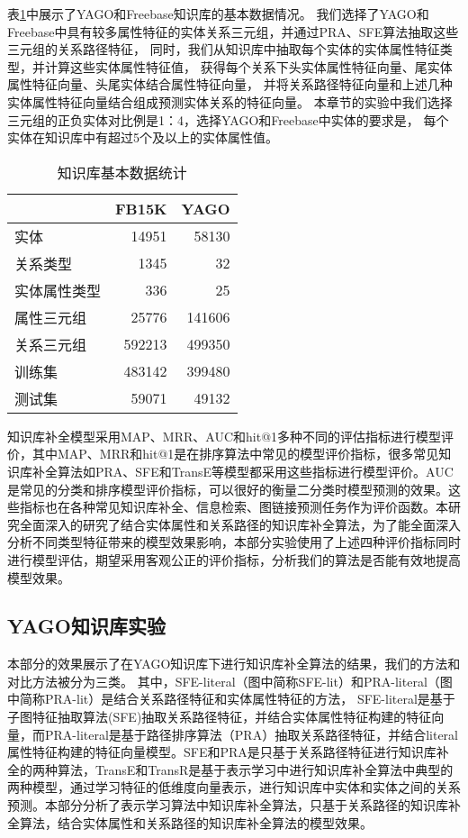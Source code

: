 表\ref{tab:addlabel-kbcExp-data}中展示了YAGO和Freebase知识库的基本数据情况。
我们选择了YAGO和Freebase中具有较多属性特征的实体关系三元组，并通过PRA、SFE算法抽取这些三元组的关系路径特征，
同时，我们从知识库中抽取每个实体的实体属性特征类型，并计算这些实体属性特征值，
获得每个关系下头实体属性特征向量、尾实体属性特征向量、头尾实体结合属性特征向量，
并将关系路径特征向量和上述几种实体属性特征向量结合组成预测实体关系的特征向量。
本章节的实验中我们选择三元组的正负实体对比例是1：4，选择YAGO和Freebase中实体的要求是，
每个实体在知识库中有超过5个及以上的实体属性值。

\begin{table}[htbp]
  \centering
  \caption{知识库基本数据统计}
    \begin{tabular}{|l|r|r|}
    \hline
    \textcolor[rgb]{ .141,  .161,  .18}{} & \multicolumn{1}{l|}{FB15K} & \multicolumn{1}{l|}{YAGO} \\
    \hline
    实体    & 14951 & 58130 \\
    \hline
    关系类型  & 1345  & 32 \\
    \hline
    实体属性类型 & 336   & 25 \\
    \hline
    属性三元组 & 25776 & 141606 \\
    \hline
    关系三元组 & 592213 & 499350 \\
    \hline
    训练集   & 483142 & 399480 \\
    \hline
    测试集   & 59071 & 49132 \\
    \hline
    \end{tabular}%
  \label{tab:addlabel-kbcExp-data}%
\end{table}%

知识库补全模型采用MAP、MRR、AUC和hit@1多种不同的评估指标进行模型评价，其中MAP、MRR和hit@1是在排序算法中常见的模型评价指标，很多常见知识库补全算法如PRA、SFE和TransE等模型都采用这些指标进行模型评价。AUC是常见的分类和排序模型评价指标，可以很好的衡量二分类时模型预测的效果。这些指标也在各种常见知识库补全、信息检索、图链接预测任务作为评价函数。本研究全面深入的研究了结合实体属性和关系路径的知识库补全算法，为了能全面深入分析不同类型特征带来的模型效果影响，本部分实验使用了上述四种评价指标同时进行模型评估，期望采用客观公正的评价指标，分析我们的算法是否能有效地提高模型效果。

\subsection{YAGO知识库实验}
\label{cha:exp-literal}
本部分的效果展示了在YAGO知识库下进行知识库补全算法的结果，我们的方法和对比方法被分为三类。
其中，SFE-literal（图中简称SFE-lit）和PRA-literal（图中简称PRA-lit）是结合关系路径特征和实体属性特征的方法，
SFE-literal是基于子图特征抽取算法(SFE)抽取关系路径特征，并结合实体属性特征构建的特征向量，而PRA-literal是基于路径排序算法（PRA）抽取关系路径特征，并结合literal属性特征构建的特征向量模型。SFE和PRA是只基于关系路径特征进行知识库补全的两种算法，TransE和TransR是基于表示学习中进行知识库补全算法中典型的两种模型，通过学习特征的低维度向量表示，进行知识库中实体和实体之间的关系预测。本部分分析了表示学习算法中知识库补全算法，只基于关系路径的知识库补全算法，结合实体属性和关系路径的知识库补全算法的模型效果。

